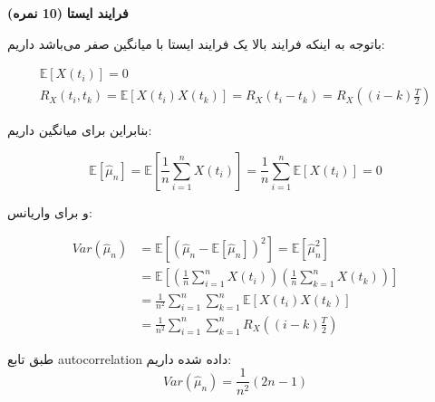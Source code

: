 \Large \textbf{فرایند ایستا}
\large \textbf{(10 نمره)}

\normalsize \vspace{0.5cm}

باتوجه به اینکه فرایند بالا یک فرایند ایستا با میانگین صفر می‌باشد داریم:

$$
\begin{array}{c}
	\mathbb{E}\left[ {X\left( {{t_i}} \right)} \right] = 0\\
	{R_X}\left( {{t_i},{t_k}} \right) = \mathbb{E}\left[ {X\left( {{t_i}} \right)X\left( {{t_k}} \right)} \right] = {R_X}\left( {{t_i} - {t_k}} \right) = {R_X}\left( {\left( {i - k} \right)\frac{T}{2}} \right)
\end{array}
$$

بنابراین برای میانگین داریم:

$$
\mathbb{E}\left[ {{{\hat \mu }_n}} \right] = \mathbb{E}\left[ {\frac{1}{n}\sum\limits_{i = 1}^n {X\left( {{t_i}} \right)} } \right] = \frac{1}{n}\sum\limits_{i = 1}^n {\mathbb{E}\left[ {X\left( {{t_i}} \right)} \right]}  = 0
$$

و برای واریانس:

$$
\begin{aligned}
	Var\left( {{{\hat \mu }_n}} \right) & = \mathbb{E}\left[ {{{\left( {{{\hat \mu }_n} - \mathbb{E}\left[ {{{\hat \mu }_n}} \right]} \right)}^2}} \right] = \mathbb{E}\left[ {\hat \mu _n^2} \right]\\
	& ‌=\mathbb{E}\left[ {\left( {\frac{1}{n}\sum\limits_{i = 1}^n {X\left( {{t_i}} \right)} } \right)\left( {\frac{1}{n}\sum\limits_{k = 1}^n {X\left( {{t_k}} \right)} } \right)} \right]\\
	& = \frac{1}{{{n^2}}}\sum\limits_{i = 1}^n {\sum\limits_{k = 1}^n {\mathbb{E}\left[ {X\left( {{t_i}} \right)X\left( {{t_k}} \right)} \right]} } \\
	& = \frac{1}{{{n^2}}}\sum\limits_{i = 1}^n {\sum\limits_{k = 1}^n {{R_X}\left( {\left( {i - k} \right)\frac{T}{2}} \right)} } 
\end{aligned}
$$

طبق تابع autocorrelation داده شده داریم:
$$
Var\left( {{{\hat \mu }_n}} \right) = \frac{1}{{{n^2}}}\left( {2n - 1} \right)
$$
